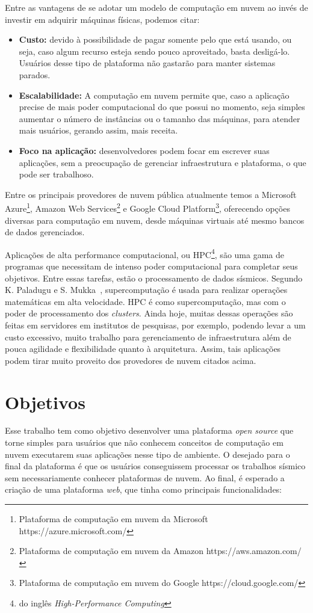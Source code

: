 \documentclass[11pt,twoside]{article}
\begin{document}
Entre as vantagens de se adotar um modelo de computação em nuvem ao invés de investir em adquirir máquinas físicas, podemos citar:

\begin{itemize}
  \item \textbf{Custo:} devido à possibilidade de pagar somente pelo que está usando, ou seja, caso algum recurso esteja sendo pouco aproveitado, basta desligá-lo. Usuários desse tipo de 
  plataforma não gastarão para manter sistemas parados.
  \item \textbf{Escalabilidade:} A computação em nuvem permite que, caso a aplicação precise de mais poder computacional do que possui no momento, seja simples aumentar
  o número de instâncias ou o tamanho das máquinas, para atender mais usuários, gerando assim, mais receita.
  \item \textbf{Foco na aplicação:} desenvolvedores podem focar em escrever suas 
  aplicações, sem a preocupação de gerenciar infraestrutura e plataforma, o que pode ser trabalhoso.

\end{itemize}

Entre os principais provedores de nuvem pública atualmente temos a Microsoft Azure\footnote{Plataforma de computação em nuvem da Microsoft https://azure.microsoft.com/}, 
Amazon Web Services\footnote{Plataforma de computação em nuvem da Amazon https://aws.amazon.com/} e Google Cloud Platform\footnote{Plataforma de computação em nuvem do Google https://cloud.google.com/}, 
oferecendo opções diversas para computação em nuvem, desde máquinas virtuais até mesmo bancos de dados gerenciados.

Aplicações de alta performance computacional, ou HPC\footnote{do inglês \emph{High-Performance Computing}}, são uma gama de programas que necessitam de intenso poder computacional para 
completar seus objetivos. Entre essas tarefas, estão o processamento de dados sísmicos. Segundo K. Paladugu e S. Mukka~\cite{HPC}, supercomputação é usada para realizar operações matemáticas em alta velocidade. HPC é como supercomputação,
mas com o poder de processamento dos \emph{clusters}.
Ainda hoje, muitas dessas operações são feitas em servidores em institutos de pesquisas, por exemplo, podendo levar
a um custo excessivo, muito trabalho para gerenciamento de infraestrutura além de pouca agilidade e flexibilidade quanto à arquitetura. Assim, tais aplicações podem 
tirar muito proveito dos provedores de nuvem citados acima.

\section{Objetivos}
Esse trabalho tem como objetivo desenvolver uma plataforma \emph{open source} que torne simples para usuários que não conhecem conceitos de computação em nuvem 
executarem suas aplicações nesse tipo de ambiente. 
O desejado para o final da plataforma é que os usuários conseguissem processar 
os trabalhos sísmico sem necessariamente conhecer plataformas de nuvem.  
Ao final, é esperado a criação de uma plataforma \emph{web}, que tinha como principais funcionalidades:
\end{document}

